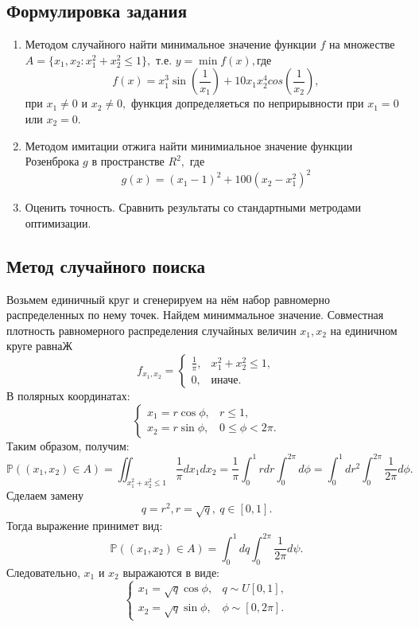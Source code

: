 \documentclass[11pt]{article}
\numberwithin{equation}{section}
\begin{document}
\subsection{Формулировка задания}
\begin{enumerate}
  \item Методом случайного найти минимальное значение функции $f$ на множестве 
  $A = \{ x_1, x_2: x_1^2+x_2^2\leq 1\},$ т.е. $y=\min f(x),$где 
  $$ f(x) = x_1^3 \sin(\frac{1}{x_1})+10x_1x_2^4cos(\frac{1}{x_2}),$$
  при $x_1 \not = 0$ и $x_2 \not = 0,$ функция допределяеться по неприрывности при $x_1=0$ или $x_2=0.$
  \item Методом имитации отжига найти минимиальное значение функции Розенброка $g$ в пространстве $R^2,$ где 
  $$ g(x) = (x_1-1)^2+100(x_2-x_1^2)^2$$
  \item Оценить точность. Сравнить результаты со стандартными метродами оптимизации.
\end{enumerate}
\subsection{Метод случайного поиска}
Возьмем единичный круг и сгенерируем на нём набор равномерно распределенных по нему точек.
Найдем миниммальное значение. Совместная плотность равномерного распределения случайных величин $x_1, x_2$ на единичном круге равнаЖ
\begin{equation*}
  f_{x_1,x_2} = 
   \begin{cases}
     \frac{1}{\pi}, & x_1^2+x_2^2 \leq 1,\\
     0, & \text{иначе.}
   \end{cases}
\end{equation*}
В полярных координатах:
\begin{equation*}
   \begin{cases}
     x_1 = r \cos \phi, & r \leq 1,\\
     x_2 = r \sin \phi, & 0 \leq \phi < 2\pi.
   \end{cases}
\end{equation*}
Таким образом, получим:
$$ \mathbb{P} ((x_1,x_2)\in A) = \iint_{x_1^2+x_2^2\leq1} \frac{1}{\pi} dx_1 dx_2 = \frac{1}{\pi} \int_0^1 r dr\int_0^{2\pi} d\phi = \int_0^1 dr^2 \int_0^{2\pi} \frac{1}{2\pi} d\phi.$$
Сделаем замену 
$$ q = r^2, r = \sqrt{q}, \ q \in [0,1].$$
Тогда выражение принимет вид:
$$\mathbb{P} ((x_1,x_2)\in A) = \int_0^1 dq \int_0^{2\pi} \frac{1}{2\pi} d\psi.$$
Следовательно, $x_1$ и $x_2$ выражаются в виде:
\begin{equation*}
  \begin{cases}
    x_1 = \sqrt{q} \cos \phi, & q \sim U[0,1],\\
    x_2 = \sqrt{q} \sin \phi, & \phi \sim [0,2\pi].
  \end{cases}
\end{equation*}
\end{document}
